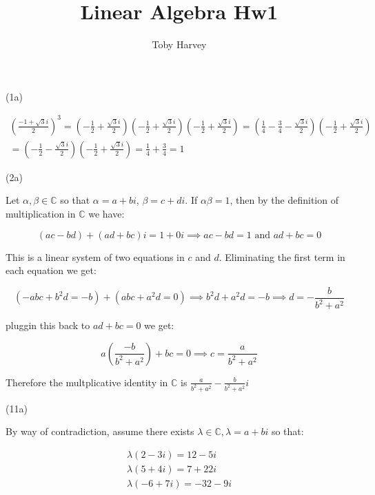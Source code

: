 \documentclass{article}
\begin{document}
\title{Linear Algebra Hw1}
\author{Toby Harvey}
\maketitle

\noindent(1a)

\begin{gather*}
  \left(\frac{-1 + \sqrt{3}i}{2}\right)^3 = \left(-\frac{1}{2} + \frac{\sqrt{3}i}{2}\right)\left(-\frac{1}{2} + \frac{\sqrt{3}i}{2}\right)\left(-\frac{1}{2} + \frac{\sqrt{3}i}{2}\right) = \left(\frac{1}{4} - \frac{3}{4} - \frac{\sqrt{3}i}{2}\right)\left(-\frac{1}{2} + \frac{\sqrt{3}i}{2}\right)\\
  =  \left(-\frac{1}{2} - \frac{\sqrt{3}i}{2}\right)\left(-\frac{1}{2} + \frac{\sqrt{3}i}{2}\right) = \frac{1}{4} + \frac{3}{4} = 1
\end{gather*}

\vspace{3mm}

\noindent(2a)

\vspace{3mm}

\noindent Let $\alpha, \beta \in \mathbb{C}$ so that $\alpha = a + bi$, $\beta = c+di$. If $\alpha\beta = 1$,
then by the definition of multiplication in $\mathbb{C}$ we have:


$$(ac - bd) + (ad + bc)i = 1 + 0i \implies ac - bd = 1 \text{ and } ad + bc = 0$$

\noindent This is a linear system of two equations in $c$ and $d$. Eliminating the first term in each equation we get:

$$(-abc + b^2d = -b) + (abc + a^2d = 0) \implies b^2d + a^2d = -b \implies d = - \frac{b}{b^2 + a^2}$$

\noindent pluggin this back to $ad + bc = 0$ we get:

$$a\left(\frac{-b}{b^2 + a^2}\right) + bc = 0 \implies c = \frac{a}{b^2 + a^2}$$

\noindent Therefore the multplicative identity in $\mathbb{C}$ is $\frac{a}{b^2 + a^2} - \frac{b}{b^2 + a^2}i$

\newpage

\noindent(11a)

\vspace{3mm}

\noindent By way of contradiction, assume there exists $\lambda \in \mathbb{C}, \lambda = a +bi$ so that:

\begin{gather*}
  \lambda(2 - 3i) = 12 - 5i\\
  \lambda(5 + 4i) = 7 + 22i\\
  \lambda(-6 + 7i) = -32 - 9i\\
\end{gather*}
\end{document}
